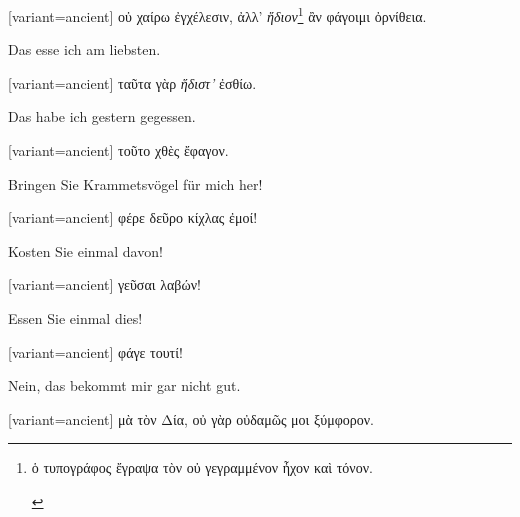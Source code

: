 \switchcolumn

\begin{greek}[variant=ancient]%
οὐ χαίρω ἐγχέλεσιν, ἀλλ' \emph{ἥδιον}\footnote{\begin{latin}%
\textgreek[variant=ancient]{ὁ τυπογράφος ἔγραψα τὸν οὐ γεγραμμένον
ἦχον καὶ τόνον.}\end{latin}%
} ἂν φάγοιμι ὀρνίθεια.

\end{greek}%
\switchcolumn*

Das esse ich am liebsten.

\switchcolumn

\begin{greek}[variant=ancient]%
ταῦτα γὰρ \emph{ἥδιστ'} ἐσθίω.

\end{greek}%
\switchcolumn*

Das habe ich gestern gegessen.

\switchcolumn

\begin{greek}[variant=ancient]%
τοῦτο χθὲς ἔφαγον.

\end{greek}%
\switchcolumn*

Bringen Sie Krammets\textcompwordmark{}vögel für mich her!

\switchcolumn

\begin{greek}[variant=ancient]%
φέρε δεῦρο κίχλας ἐμοί!

\end{greek}%
\switchcolumn*

Kosten Sie einmal davon!

\switchcolumn

\begin{greek}[variant=ancient]%
γεῦσαι λαβών!

\end{greek}%
\switchcolumn*

Essen Sie einmal dies!

\switchcolumn

\begin{greek}[variant=ancient]%
φάγε τουτί!

\end{greek}%
\switchcolumn*

Nein, das bekommt mir gar nicht gut.

\switchcolumn

\begin{greek}[variant=ancient]%
μὰ τὸν Δία, οὐ γὰρ οὐδαμῶς μοι ξύμφορον.

\end{greek}%
\switchcolumn*

